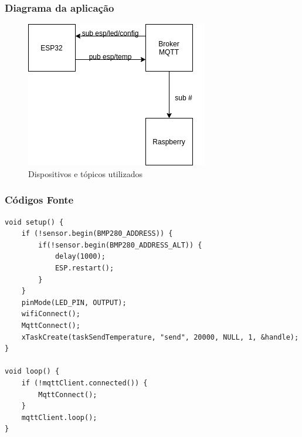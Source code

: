 \documentclass[12pt]{beamer}
\begin{document}
\begin{frame}
    \frametitle{Diagrama da aplicação}
    \begin{figure}[!htb]
        \centering
        \includegraphics[width=.7\textwidth]{aplication}
        \caption{\label{fig:aplication} Dispositivos e tópicos utilizados}
    \end{figure}
\end{frame}

\begin{frame}{\insertsectionhead}
    \frametitle{Códigos Fonte}
    \begin{lstlisting}
void setup() {
    if (!sensor.begin(BMP280_ADDRESS)) {
        if(!sensor.begin(BMP280_ADDRESS_ALT)) {
            delay(1000);
            ESP.restart();
        }
    }
    pinMode(LED_PIN, OUTPUT);
    wifiConnect();
    MqttConnect();
    xTaskCreate(taskSendTemperature, "send", 20000, NULL, 1, &handle);
}

void loop() {
    if (!mqttClient.connected()) {
        MqttConnect();
    }
    mqttClient.loop();
}
    \end{lstlisting}
\end{frame}
\end{document}
